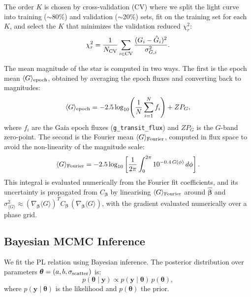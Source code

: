 \documentclass[10pt,preprint2]{aastex}
\begin{document}
The order $K$ is chosen by cross-validation (CV) where we split the light curve into training ($\sim$80\%) and validation ($\sim$20\%) sets, fit on the training set for each $K$, and select the $K$ that minimizes the validation reduced $\chi^2_r$:
\begin{equation}
  \chi^2_r = \frac{1}{N_{\rm CV}} \sum_{i \in \rm CV} \frac{(G_i - \hat{G}_i)^2}{\sigma_{G,i}^2}.
\end{equation}

The mean magnitude of the star is computed in two ways. The first is the epoch mean $\langle G \rangle_{\rm epoch}$, obtained by averaging the epoch fluxes and converting back to magnitudes:
\begin{equation}
  \langle G \rangle_{\rm epoch} = -2.5\log_{10}\!\left(\frac{1}{N}\sum_{i=1}^{N} f_i\right) + ZP_G,
\end{equation}
where $f_i$ are the Gaia epoch fluxes (\texttt{g\_transit\_flux}) and $ZP_G$ is the $G$-band zero-point.
The second is the Fourier mean $\langle G \rangle_{\rm Fourier}$, computed in flux space to avoid the non-linearity of the magnitude scale:
\begin{equation}
  \langle G \rangle_{\rm Fourier} = -2.5 \log_{10}\left[ \frac{1}{2\pi} \int_0^{2\pi} 10^{-0.4\, G(\phi)}\, d\phi \right].
\end{equation}
This integral is evaluated numerically from the Fourier fit coefficients, and its uncertainty is propagated from $C_{\boldsymbol{\beta}}$ by linearising $\langle G \rangle_{\rm Fourier}$ around $\hat{\boldsymbol{\beta}}$ and $\sigma_{\langle G \rangle}^2 \approx (\nabla_{\boldsymbol{\beta}} \langle G \rangle)^T C_{\boldsymbol{\beta}}\, (\nabla_{\boldsymbol{\beta}} \langle G \rangle)$, with the gradient evaluated numerically over a phase grid.

\subsection{Bayesian MCMC Inference}

We fit the PL relation using Bayesian inference. The posterior distribution over parameters $\boldsymbol{\theta} = (a, b, \sigma_{\rm scatter})$ is:
\begin{equation}
  p(\boldsymbol{\theta} \mid \mathbf{y}) \propto p(\mathbf{y} \mid \boldsymbol{\theta})\, p(\boldsymbol{\theta}),
\end{equation}
where $p(\mathbf{y} \mid \boldsymbol{\theta})$ is the likelihood and $p(\boldsymbol{\theta})$ the prior.
\end{document}
